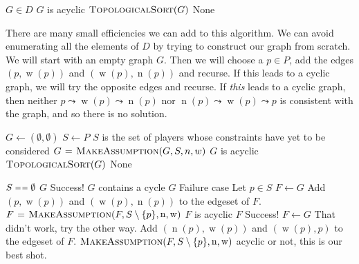 \documentclass[12pt,x11names, rgb]{article}
\DeclareMathOperator{\w}{w}
\DeclareMathOperator{\n}{n}
\begin{document}
    \begin{codebox}
    \li \For $G\in D$
    \li     \Do
            \If $G$ is acyclic
    \li         \Do
                    \Return $\textnormal{\scshape TopologicalSort}(G)$
            \End
        \End
    \li \Return None
    \end{codebox}
        
    There are many small efficiencies we can add to this algorithm. We can avoid enumerating all the elements of $D$ by trying to construct our graph from scratch. We will start with an empty graph $G$. Then we will choose a $p \in P$, add the edges $(p,\w(p))$ and $(\w(p),\n(p))$ and recurse. If this leads to a cyclic graph, we will try the opposite edges and recurse. If \emph{this} leads to a cyclic graph, then neither $p \leadsto \w(p) \leadsto \n(p)$ nor $\n(p) \leadsto \w(p) \leadsto p$ is consistent with the graph, and so there is no solution.

    \begin{codebox}
    \li $G \gets (\emptyset, \emptyset)$
    \li $S \gets P$ \> \> \Comment $S$ is the set of players whose constraints have yet to be considered
    \li $G \mathrel{\hspace{1pt}=\hspace{1pt}} \textnormal{\scshape MakeAssumption}(G,S,n,w)$
    \li \If $G$ is acyclic
    \li     \Do
            \Return $\textnormal{\scshape TopologicalSort}(G)$
        \End
    \li \Return None
    \end{codebox}


    \begin{codebox}
    \Procname{$\proc{MakeAssumption}(G,S,\n,\w)$}
    \li \If $S \isequal \emptyset$
    \li     \Then
            \Return $G$ \Comment Success!
        \End
    \li \If $G$ contains a cycle
    \li     \Then
            \Return $G$ \Comment Failure case
        \End
    \li Let $p \in S$
    \li $F \gets G$
    \li Add $(p,\w(p))$ and $(\w(p),\n(p))$ to the edgeset of $F$.
    \li $F \gets \proc{MakeAssumption}(F,S\setminus \{p\}, \n, \w)$
    \li \If $F$ is acyclic
    \li     \Do
            \Return $F$ \Comment Success!
        \End
    \li $F \gets G$ \Comment That didn't work, try the other way.
    \li Add $(\n(p),\w(p))$ and $(\w(p),p)$ to the edgeset of $F$.
    \li \Return $\proc{MakeAssumption}(F,S\setminus \{p\}, \n, \w)$ \Comment acyclic or not, this is our best shot.
    \end{codebox}
\end{document}
